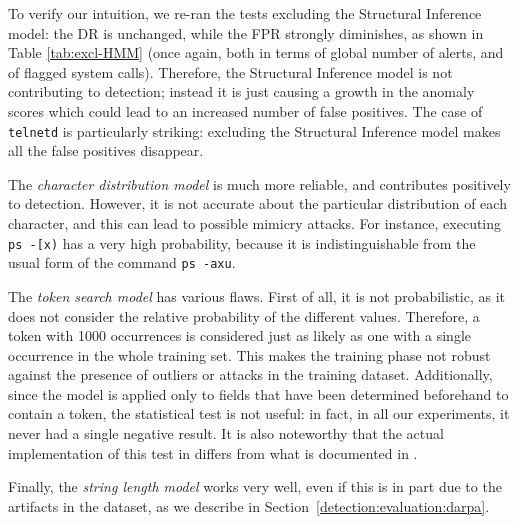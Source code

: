 To verify our intuition, we re-ran the tests excluding the Structural
Inference model: the \ac{DR} is unchanged, while the \ac{FPR} strongly
diminishes, as shown in Table \ref{tab:excl-HMM} (once again, both in
terms of global number of alerts, and of flagged system
calls). Therefore, the Structural Inference model is not contributing
to detection; instead it is just causing a growth in the anomaly
scores which could lead to an increased number of false positives. The
case of \texttt{telnetd} is particularly striking: excluding the
Structural Inference model makes all the false positives disappear.

The \emph{character distribution model} is much more reliable, and
contributes positively to detection. However, it is not accurate about
the particular distribution of each character, and this can lead to
possible mimicry attacks. For instance, executing \texttt{ps -[x)} has
a very high probability, because it is indistinguishable from the
usual form of the command \texttt{ps -axu}.

The \emph{token search model} has various flaws. First of all, it is
not probabilistic, as it does not consider the relative probability of
the different values. Therefore, a token with 1000 occurrences is
considered just as likely as one with a single occurrence in the whole
training set. This makes the training phase not robust against the
presence of outliers or attacks in the training dataset. Additionally,
since the model is applied only to fields that have been determined
beforehand to contain a token, the statistical test is not useful: in
fact, in all our experiments, it never had a single negative
result. It is also noteworthy that the actual implementation of this
test in \citep{libanomalySite} differs from what is documented in
\citep{libanomaly, mutz06:syscalls, lee-learning}.

Finally, the \emph{string length model} works very well, even if this
is in part due to the artifacts in the dataset, as we describe in
Section~\ref{detection:evaluation:darpa}.

